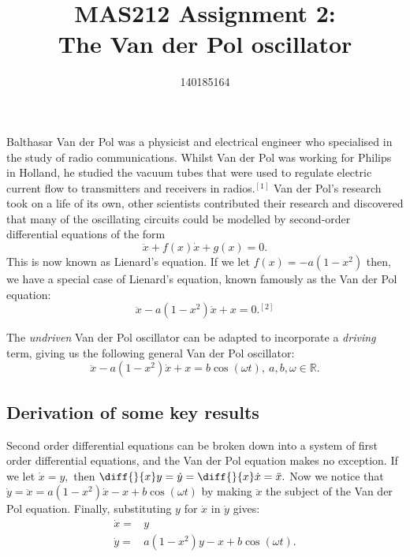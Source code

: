 \documentclass[11pt,a4paper]{amsart}
\title{MAS212 Assignment 2:\\The Van der Pol oscillator}
\author{140185164}
\begin{document}
\maketitle

Balthasar Van der Pol was  a physicist and electrical engineer who specialised in the study of radio communications. Whilst Van der Pol was working for Philips in Holland, he studied the vacuum tubes that were used to regulate electric current flow to transmitters and receivers in radios.$^{[1]}$ Van der Pol's research took on a life of its own, other scientists contributed their research and discovered that many of the oscillating circuits could be modelled by second-order differential equations of the form $$\ddot{x} +f(x)\dot{x}+g(x)=0.$$
This is now known as Lienard's equation. If we let $f(x)=-a(1-x^2)$ then, we have a special case of Lienard's equation, known famously as the Van der Pol equation: $$\ddot{x} -a(1-x^2)\dot{x} + x =0.^{[2]}$$\par
The \textit{undriven} Van der Pol oscillator can be adapted to incorporate a \textit{driving} term, giving us the following general Van der Pol oscillator:
\begin{equation}\ddot{x} -a(1-x^2)\dot{x} + x =b\cos(\omega t),\ a,b,\omega\in\mathbb{R}.\end{equation}

\subsection*{Derivation of some key results}Second order differential equations can be broken down into a system of first order differential equations, and the Van der Pol equation makes no exception. If we let $\dot{x}=y,$ then $\diff{}{x}y=\dot{y}=\diff{}{x}\dot{x}=\ddot{x}.$ Now we notice that $\dot{y}=\ddot{x}=a(1-x^2)\dot{x}-x+b\cos(\omega t)$ by making $\ddot{x}$ the subject of the Van der Pol equation. Finally, substituting $y$ for $\dot{x}$ in $\dot{y}$ gives:
\begin{align} 
\dot{x}=&y \nonumber \\
\dot{y}=&a(1-x^2)y-x+b\cos(\omega t).
\end{align}
\end{document}
